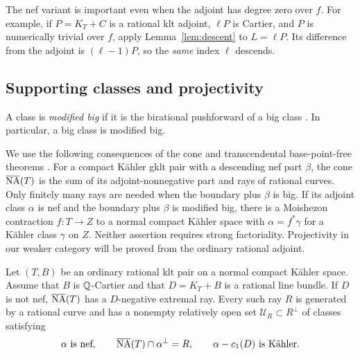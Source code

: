 The nef variant is important even when the adjoint has degree zero over
$f$.  For example, if $P=K_T+C$ is a rational klt adjoint, $\ell P$ is
Cartier, and $P$ is numerically trivial over $f$, apply
Lemma~\ref{lem:descent} to $L=\ell P$.  Its difference from the adjoint
is $(\ell-1)P$, so the \emph{same} index $\ell$ descends.

\subsection{Supporting classes and projectivity}

A class is \emph{modified big} if it is the birational pushforward of a big class
\cite[Definition~2.8]{HX2026}. In particular, a big class is modified big.

We use the following consequences of the cone and transcendental
base-point-free theorems \cite[Theorems~1.3 and~1.4]{HX2026}.  For a
compact K\"ahler gklt pair with a descending nef part $\beta$, the cone
$\overline{\mathrm{NA}}(T)$ is the sum of its adjoint-nonnegative part and rays of rational
curves.  Only finitely many rays are needed when the boundary plus
$\beta$ is big.  If its adjoint class $\alpha$ is nef and the boundary
plus $\beta$ is modified big, there is a Moishezon contraction
$f:T\to Z$ to a normal compact K\"ahler space with $\alpha=f^*\gamma$
for a K\"ahler class $\gamma$ on $Z$.  Neither assertion requires strong
factoriality.  Projectivity in our weaker category will be proved from
the ordinary rational adjoint.

\begin{lemma}\label{lem:absolute-support}
Let $(T,B)$ be an ordinary rational klt pair on a normal compact K\"ahler
space.  Assume that $B$ is $\mathbb Q$-Cartier and that $D=K_T+B$ is a rational
line bundle.  If $D$ is not nef, $\overline{\mathrm{NA}}(T)$ has a $D$-negative extremal ray.
Every such ray $R$ is generated by a rational curve and has a nonempty
relatively open set $\mathcal U_R\subset R^\perp$ of classes satisfying
\begin{equation}\label{eq:absolute-support}
 \alpha\text{ is nef},\qquad
 \overline{\mathrm{NA}}(T)\cap\alpha^\perp=R,\qquad
 \alpha-c_1(D)\text{ is K\"ahler}.
\end{equation}
\end{lemma}

